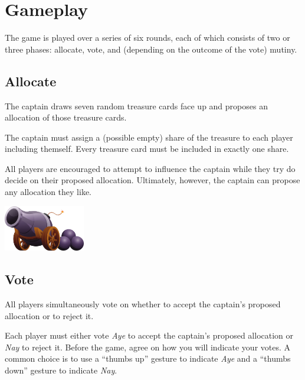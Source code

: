 \section*{Gameplay}
The game is played over a series of six rounds, each of which consists of two or three phases: allocate, vote, and (depending on the outcome of the vote) mutiny.

\subsection*{Allocate}
The captain draws seven random treasure cards face up and proposes an allocation of those treasure cards.

The captain must assign a (possible empty) share of the treasure to each player including themself. Every treasure card must be included in exactly one share.

All players are encouraged to attempt to influence the captain while they try do decide on their proposed allocation.
Ultimately, however, the captain can propose any allocation they like. 

\begin{center}
\includegraphics[height=2cm]{Images/cannon.png} \quad {}%
\end{center}

\newpage

\subsection*{Vote}
All players simultaneously vote on whether to accept the captain's proposed allocation or to reject it.

Each player must either vote \textit{Aye} to accept the captain's proposed allocation or \textit{Nay} to reject it.
Before the game, agree on how you will indicate your votes. A common choice is to use a ``thumbs up'' gesture to indicate \textit{Aye} and a ``thumbs down'' gesture to indicate \textit{Nay}.

